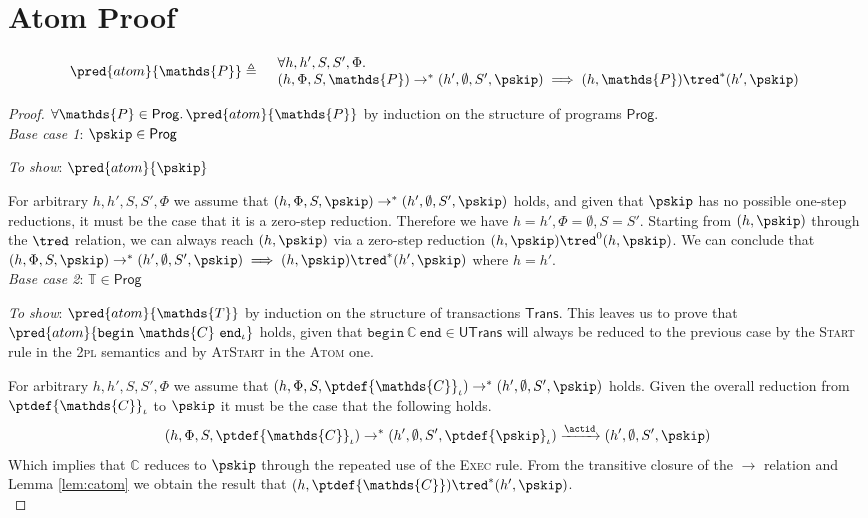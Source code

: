 \section{Atom Proof}

\[
\begin{array}{r l}
	\pred{atom}{\mathds{P}} \triangleq&
	\begin{array}{l}
	\forall h, h', S, S', \Phi \ldotp \\
	(h, \Phi, S, \mathds{P}) \rightarrow^* (h', \emptyset, S', \pskip) \implies 
	(h, \mathds{P}) \tred^* (h', \pskip)
	\end{array}
\end{array}
\]

{\parindent0pt
\begin{proof}
$\forall \mathds{P} \in \mathsf{Prog} \ldotp \pred{atom}{\mathds{P}}$ by induction on the structure of programs $\mathsf{Prog}$. \\

\textit{Base case 1}: $\pskip \in \mathsf{Prog}$

\textit{To show}: $\pred{atom}{\pskip}$

For arbitrary $h, h', S, S', \Phi$ we assume that $(h, \Phi, S, \pskip) \rightarrow^* (h', \emptyset, S', \pskip)$ holds, and given that $\pskip$ has no possible one-step reductions, it must be the case that it is a zero-step reduction. Therefore we have $h = h', \Phi = \emptyset, S = S'$. Starting from $(h, \pskip)$ through the $\tred$ relation, we can always reach $(h, \pskip)$ via a zero-step reduction $(h, \pskip) \tred^0 (h, \pskip)$. We can conclude that $(h, \Phi, S, \pskip) \rightarrow^* (h', \emptyset, S', \pskip) \implies (h, \pskip) \tred^* (h', \pskip)$ where $h = h'$. \\

\textit{Base case 2}: $\mathds{T} \in \mathsf{Prog}$

\textit{To show}: $\pred{atom}{\mathds{T}}$ by induction on the structure of transactions $\mathsf{Trans}$. This leaves us to prove that $\pred{atom}{\mathtt{begin}\ \mathds{C}\ \mathtt{end}_\iota}$ holds, given that $\mathtt{begin}\ \mathds{C}\ \mathtt{end} \in \mathsf{UTrans}$ will always be reduced to the previous case by the \textsc{Start} rule in the \textsc{2pl} semantics and by \textsc{AtStart} in the \textsc{Atom} one.

For arbitrary $h, h', S, S', \Phi$ we assume that $(h, \Phi, S, \ptdef{\mathds{C}}_\iota) \rightarrow^* (h', \emptyset, S', \pskip)$ holds. Given the overall reduction from $\ptdef{\mathds{C}}_\iota$ to $\pskip$ it must be the case that the following holds.
\[
(h, \Phi, S, \ptdef{\mathds{C}}_\iota) \rightarrow^* (h', \emptyset, S', \ptdef{\pskip}_\iota) \xrightarrow{\actid} (h', \emptyset, S', \pskip)
\]
Which implies that $\mathds{C}$ reduces to $\pskip$ through the repeated use of the \textsc{Exec} rule. From the transitive closure of the $\rightarrow$ relation and Lemma \ref{lem:catom} we obtain the result that $(h, \ptdef{\mathds{C}}) \tred^* (h', \pskip)$. \\


\end{proof}}
